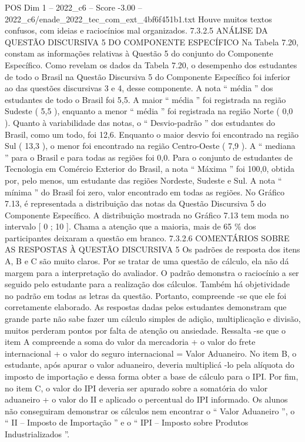 \begin{textsample}{POS Dim 1 – 2022\_c6 – Score -3.00 – 2022\_c6/enade\_2022\_tec\_com\_ext\_4bf6f451b1.txt}
Houve muitos textos confusos, com ideias e raciocínios mal organizados. 7.3.2.5 ANÁLISE DA QUESTÃO DISCURSIVA 5 DO COMPONENTE ESPECÍFICO Na Tabela 7.20, constam as informações relativas à Questão 5 do conjunto do Componente Específico.
Como revelam os dados da Tabela 7.20, o desempenho dos estudantes de todo o Brasil na Questão Discursiva 5 do Componente Específico foi inferior ao das questões discursivas 3 e 4, desse componente.
A nota “ média ” dos estudantes de todo o Brasil foi 5,5.
A maior “ média ” foi registrada na região Sudeste ( 5,5 ), enquanto a menor “ média ” foi registrada na região Norte ( 0,0 ).
Quanto à variabilidade das notas, o “ Desvio-padrão ” dos estudantes do Brasil, como um todo, foi 12,6.
Enquanto o maior desvio foi encontrado na região Sul ( 13,3 ), o menor foi encontrado na região Centro-Oeste ( 7,9 ).
A “ mediana ” para o Brasil e para todas as regiões foi 0,0.
Para o conjunto de estudantes de Tecnologia em Comércio Exterior do Brasil, a nota “ Máxima ” foi 100,0, obtida por, pelo menos, um estudante das regiões Nordeste, Sudeste e Sul.
A nota “ mínima ” do Brasil foi zero, valor encontrado em todas as regiões.
No Gráfico 7.13, é representada a distribuição das notas da Questão Discursiva 5 do Componente Específico.
A distribuição mostrada no Gráfico 7.13 tem moda no intervalo [ 0 ; 10 ].
Chama a atenção que a maioria, mais de 65 \% dos participantes deixaram a questão em branco. 7.3.2.6 COMENTÁRIOS SOBRE AS RESPOSTAS À QUESTÃO DISCURSIVA 5 Os padrões de resposta dos itens A, B e C são muito claros.
Por se tratar de uma questão de cálculo, ela não dá margem para a interpretação do avaliador.
O padrão demonstra o raciocínio a ser seguido pelo estudante para a realização dos cálculos.
Também há objetividade no padrão em todas as letras da questão.
Portanto, compreende -se que ele foi corretamente elaborado.
As respostas dadas pelos estudantes demonstram que grande parte não sabe fazer um cálculo simples de adição, multiplicação e divisão, muitos perderam pontos por falta de atenção ou ansiedade.
Ressalta -se que o item A compreende a soma do valor da mercadoria + o valor do frete internacional + o valor do seguro internacional = Valor Aduaneiro.
No item B, o estudante, após apurar o valor aduaneiro, deveria multiplicá -lo pela alíquota do imposto de importação e dessa forma obter a base de cálculo para o IPI.
Por fim, no item C, o valor do IPI deveria ser apurado sobre a somatória do valor aduaneiro + o valor do II e aplicado o percentual do IPI informado.
Os alunos não conseguiram demonstrar os cálculos nem encontrar o “ Valor Aduaneiro ”, o “ II – Imposto de Importação ” e o “ IPI – Imposto sobre Produtos Industrializados ”.

\end{textsample}
